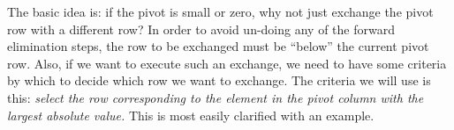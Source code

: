 The basic idea is: if the pivot is small or zero, why not just exchange the pivot row with a different row?  In order to avoid un-doing any of the forward elimination steps, the row to be exchanged must be ``below'' the current pivot row.  Also, if we want to execute such an exchange, we need to have some criteria by which to decide which row we want to exchange.  The criteria we will use is this: \emph{select the row corresponding to the element in the pivot column with the largest absolute value.} This is most easily clarified with an example.

\vspace{0.25cm}

